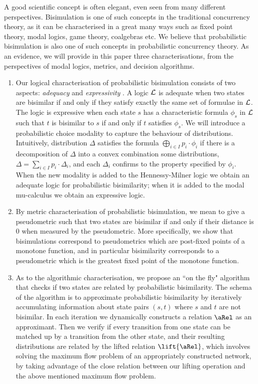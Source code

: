 \documentclass{article}
\def \CL{{\cal L}}
\begin{document}
A good scientific concept is often elegant, even seen from many
different perspectives. Bisimulation is one of such concepts in the
traditional concurrency theory, as it can be characterised in a
great many ways such as fixed point theory, modal logics, game
theory, coalgebras etc. We believe that probabilistic bisimulation
is also one of such concepts in probabilistic concurrency theory. As
an evidence, we will provide in this paper three characterisations,
from the perspectives of modal logics, metrics, and decision
algorithms.
\begin{enumerate}
\item Our logical characterisation of probabilistic bisimulation
consists of two aspects: \emph{adequacy} and \emph{expressivity}
\cite{Pnu85}. A logic $\CL$ is adequate when two states are
 bisimilar if and only if they satisfy exactly the same
set of formulae in $\CL$. The logic is expressive when each state
$s$ has a characteristic formula $\phi_s$ in $\CL$ such that $t$ is
bisimilar to $s$ if and only if $t$ satisfies $\phi_s$. We will
introduce a probabilistic choice modality  to capture the behaviour
of distributions. Intuitively, distribution $\Delta$ satisfies the
formula $\bigoplus_{i\in I}p_i\cdot\phi_i$ if there is a
decomposition of $\Delta$ into a convex combination some
distributions, $\Delta=\sum_{i\in I}p_i\cdot\Delta_i$, and each
$\Delta_i$ confirms to the property specified by $\phi_i$. When the
new modality is added to the Hennessy-Milner logic \cite{HM85} we
obtain an adequate logic for probabilistic bisimilarity; when it is
added to the modal mu-calculus \cite{Koz83} we obtain an expressive
logic.

\item By metric characterisation of probabilistic bisimulation, we
mean to give a pseudometric such that two states are bisimilar if
and only if their distance is $0$ when measured by the pseudometric.
More specifically, we show that bisimulations correspond to
pseudometrics which are post-fixed points of a monotone function,
and in particular bisimilarity corresponds to a pseudometric which
is the greatest fixed point of the monotone function.

\item As to the algorithmic characterisation, we propose an ``on the
fly" algorithm that checks if two states are related by
probabilistic bisimilarity. The schema of the algorithm is to
approximate probabilistic bisimilarity by iteratively accumulating
information about state pairs $(s,t)$ where $s$ and $t$ are not
bisimilar. In each iteration we dynamically constructs a relation
$\aRel$ as an approximant. Then we verify if every transition from
one state can be matched up by a transition from the other state,
and their resulting distributions are related by the lifted relation
$\lift{\aRel}$, which involves solving the maximum flow problem of
an appropriately constructed network, by taking advantage of the
close relation between our lifting operation and the above mentioned
maximum flow problem.
\end{enumerate}
\end{document}
